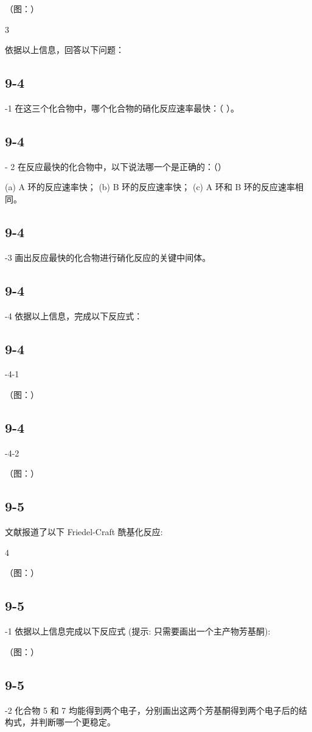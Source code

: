 （图：）

3

依据以上信息，回答以下问题：

\subsection*{9-4}
-1 在这三个化合物中，哪个化合物的硝化反应速率最快：（ ）。

\subsection*{9-4}
- 2 在反应最快的化合物中，以下说法哪一个是正确的：（）

(a) A 环的反应速率快； (b) B 环的反应速率快； (c) A 环和 B 环的反应速率相同。

\subsection*{9-4}
-3 画出反应最快的化合物进行硝化反应的关键中间体。

\subsection*{9-4}
-4 依据以上信息，完成以下反应式：

\subsection*{9-4}
-4-1

（图：）

\subsection*{9-4}
-4-2

（图：）

\subsection*{9-5}
文献报道了以下 Friedel-Craft 酰基化反应:

4

（图：）

\subsection*{9-5}
-1 依据以上信息完成以下反应式 (提示: 只需要画出一个主产物芳基酮):

（图：）

\subsection*{9-5}
-2 化合物 5 和 7 均能得到两个电子，分别画出这两个芳基酮得到两个电子后的结构式，并判断哪一个更稳定。
